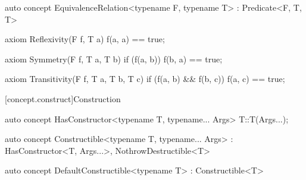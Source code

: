 \documentclass[american,twoside]{book}
\begin{document}
\begin{itemdescr}
\pnum 
{}
\end{itemdescr}

\begin{itemdecl}
auto concept EquivalenceRelation<typename F, typename T> : Predicate<F, T, T> {
  axiom Reflexivity(F f, T a) { f(a, a) == true; }

  axiom Symmetry(F f, T a, T b) { 
    if (f(a, b)) 
      f(b, a) == true; 
  }

  axiom Transitivity(F f, T a, T b, T c) {
    if (f(a, b) && f(b, c))
      f(a, c) == true;
  }
}
\end{itemdecl}

\begin{itemdescr}
\pnum 
{}
\end{itemdescr}

[concept.construct]{Construction}
\begin{itemdecl}
auto concept HasConstructor<typename T, typename... Args> {
  T::T(Args...);
}
\end{itemdecl}

\begin{itemdescr}
\pnum
{}
\end{itemdescr}

\begin{itemdecl}
auto concept Constructible<typename T, typename... Args>
  : HasConstructor<T, Args...>, NothrowDestructible<T> { }
\end{itemdecl}

\begin{itemdescr}
\pnum
{}
\end{itemdescr}

\begin{itemdecl}
auto concept DefaultConstructible<typename T> : Constructible<T> { }
\end{itemdecl}

\begin{itemdescr}
\pnum
{}
\end{itemdescr}
\end{document}
